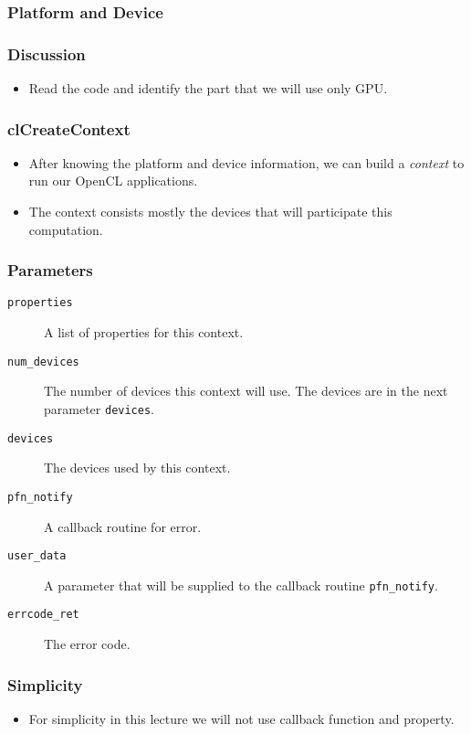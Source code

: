 \documentclass{beamer}
\begin{document}
\begin{frame}
  \frametitle{Platform and Device}
  \centerline{}
\end{frame}

\begin{frame}
  \frametitle{Discussion}
  \begin{itemize}
  \item Read the code and identify the part that we will use only GPU.
  \end{itemize}
\end{frame}

\begin{frame}
  \frametitle{clCreateContext}
  \begin{itemize}
  \item After knowing the platform and device information, we can build
    a {\em context} to run our OpenCL applications.
  \item The context consists mostly the devices that will participate
    this computation.
  \end{itemize}
\end{frame}

\begin{frame}
\end{frame}

\begin{frame}
  \frametitle{Parameters}
  \begin{description}
  \item [\tt properties] A list of properties for this context.
  \item [\tt num\_devices] The number of devices this context will
    use. The devices are in the next parameter {\tt devices}.
  \item [\tt devices] The devices used by this context.
  \item [\tt pfn\_notify] A callback routine for error.
  \item [\tt user\_data] A parameter that will be supplied to the
    callback routine {\tt pfn\_notify}.
  \item [\tt errcode\_ret] The error code.
  \end{description}
\end{frame}

\begin{frame}
  \frametitle{Simplicity}
  \begin{itemize}
  \item For simplicity in this lecture we will not use callback
    function and property.
  \end{itemize}
\end{frame}
\end{document}
